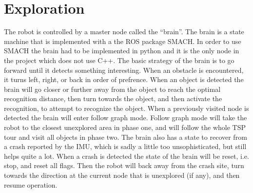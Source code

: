 \section{Exploration}

The robot is controlled by a master node called the ``brain''. 
The brain is a state machine that is implemented with a the ROS package SMACH. 
In order to use SMACH the brain had to be implemented in python and it is the only node in the project which does not use C++.
The basic strategy of the brain is to go forward until it detects something interesting. 
When an obstacle is encountered, it turns left, right, or back in order of prefrence. 
When an object is detected the brain will go closer or further away from the object to reach the optimal recognition distance, then turn towards the object, and then activate the recognition, to attempt to recognize the object.
When a previously visited node is detected the brain will enter follow graph mode.
Follow graph mode will take the robot to the closest unexplored area in phase one, and will follow the whole TSP tour and visit all objects in phase two.
The brain also has a state to recover from a crash reported by the IMU, which is sadly a little too unsophisticated, but still helps quite a lot. When a crash is detected the state of the brain will be reset, i.e. stop, and reset all flags. Then the robot will back away from the crash site, turn towards the direction at the current node that is unexplored (if any), and then resume operation.


